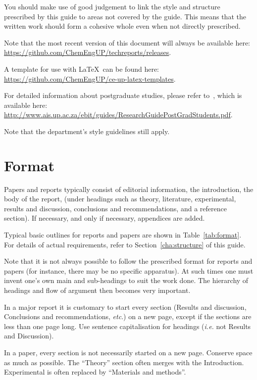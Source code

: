\documentclass[a5paper, 10pt]{article}
\begin{document}
You should make use of good judgement to link the style and
structure prescribed by this guide to areas not covered by the guide.
This means that the written work should form a cohesive whole even
when not directly prescribed.

Note that the most recent version of this document will always be available
here:\\
\url{https://github.com/ChemEngUP/techreports/releases}.

A template for use with \LaTeX\ can be found here:\\
\url{https://github.com/ChemEngUP/ce-up-latex-templates}.

For detailed information about postgraduate studies,
please refer to~\citet{buys}, which is available here:\\
\url{http://www.ais.up.ac.za/ebit/guides/ResearchGuidePostGradStudents.pdf}.

Note that the department's style guidelines still apply.


\section{Format}
\label{cha:format}
Papers and reports typically consist of editorial information, the
introduction, the body of the report, (under headings such as theory,
literature, experimental, results and discussion, conclusions and recommendations, and a reference section).
If necessary, and only if necessary, appendices are added.

Typical basic outlines for reports and papers are shown in
Table~\ref{tab:format}.
For details of actual requirements, refer to
Section~\ref{cha:structure} of this guide.  

Note that it is not always possible to follow the prescribed format for reports and papers (for instance, there may be no specific apparatus).  
At such times one must invent one's own main and sub-headings to suit the work done.  
The hierarchy of headings and flow of argument then becomes very important.

In a major report it is customary to start every section (Results and discussion,
Conclusions and recommendations, \textit{etc}.) on a new page, except if the sections are less than one page long.
Use sentence capitalisation for headings (\textit{i.e.} not Results and Discussion).

In a paper, every section is not necessarily started on a new page.
Conserve space as much as possible. The ``Theory'' section often merges with the
Introduction. Experimental is often replaced by ``Materials and methods''.
\end{document}
